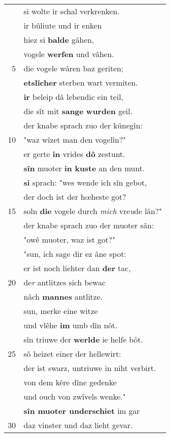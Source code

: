 \documentclass[8pt,a4paper,notitlepage]{article}
\begin{document}
\begin{table}[ht]
\begin{minipage}[t]{0.5\linewidth}
\begin{tabular}{rl}
 & si wolte ir schal verkrenken.\\ 
 & ir bûliute und ir enken\\ 
 & hiez si \textbf{balde} gâhen,\\ 
 & vogele \textbf{werfen} und vâhen.\\ 
5 & die vogele wâren baz geriten;\\ 
 & \textbf{etslîcher} sterben wart vermiten.\\ 
 & \textbf{ir} beleip dâ lebendic ein teil,\\ 
 & die sît mit \textbf{sange} \textbf{wurden} geil.\\ 
 & der knabe sprach zuo der künegîn:\\ 
10 & "waz wîzet man den vogelîn?"\\ 
 & er gerte \textbf{in} vrides \textbf{dô} zestunt.\\ 
 & \textbf{sîn} muoter \textbf{in kuste} an den munt.\\ 
 & \textbf{si} sprach: "wes wende ich sîn gebot,\\ 
 & der doch ist der hœheste got?\\ 
15 & soln \textbf{die} vogele durch \textit{mich} vre\textit{u}de lân?"\\ 
 & der knabe sprach zuo der muoter sân:\\ 
 & "owê muoter, waz ist got?"\\ 
 & "sun, ich sage dir ez âne spot:\\ 
 & er ist noch liehter dan \textbf{der} tac,\\ 
20 & de\textit{r} antlitzes sich bewac\\ 
 & nâch \textbf{mannes} antlitze.\\ 
 & sun, merke eine witze\\ 
 & und vlêhe \textbf{im} umb dîn nôt.\\ 
 & sîn triuwe der \textbf{werlde} ie helfe bôt.\\ 
25 & sô heizet einer der hellewirt:\\ 
 & der ist swarz, untriuwe in niht verbirt.\\ 
 & von dem kêre dîne gedenke\\ 
 & und ouch von zwîvels wenke."\\ 
 & \textbf{sîn muoter underschiet} im gar\\ 
30 & daz vinster und daz lieht gevar.\\ 
\end{tabular}
\scriptsize

\end{minipage}
\end{table}
\end{document}

